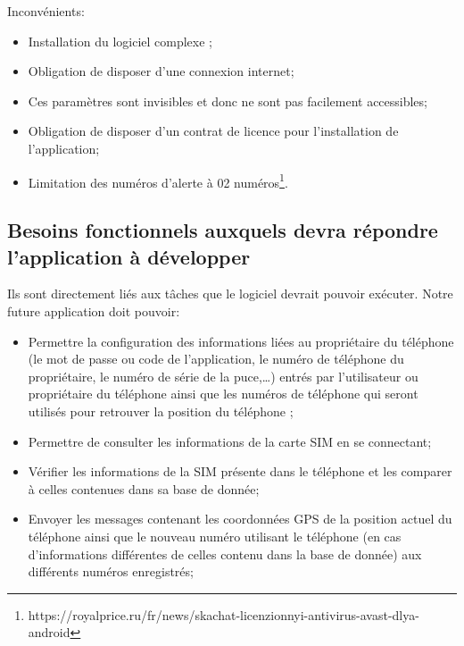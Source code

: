 \documentclass[a4paper, 12pt]{article}
\begin{document}
Inconvénients:
\begin{itemize}
\item Installation du logiciel complexe ;
\item Obligation de disposer d’une connexion internet;
\item Ces paramètres sont invisibles et donc ne sont pas facilement accessibles;
\item Obligation de disposer d’un contrat de licence pour l’installation de l’application;
\item Limitation des numéros d’alerte à 02 numéros\footnote{https://royalprice.ru/fr/news/skachat-licenzionnyi-antivirus-avast-dlya-android}.
\end{itemize}

\subsection{Besoins fonctionnels auxquels devra répondre l'application à développer}
\quad Ils sont directement liés aux tâches que le logiciel devrait pouvoir exécuter. Notre future application doit pouvoir:
\begin{itemize}
\item Permettre la configuration des informations liées au propriétaire du téléphone (le mot de passe ou code de l’application, le numéro de téléphone du propriétaire, le numéro de série de la puce,…) entrés par l’utilisateur ou propriétaire du téléphone ainsi que les numéros de téléphone qui seront utilisés pour retrouver la position du téléphone ;
\item Permettre de consulter les informations de la carte SIM en se connectant;
\item Vérifier les informations de la SIM présente dans le téléphone et les comparer à celles contenues dans sa base de donnée;
\item Envoyer les messages contenant les coordonnées GPS de la position actuel du téléphone ainsi que le nouveau numéro utilisant le téléphone (en cas d’informations différentes de celles contenu dans la base de donnée) aux différents numéros enregistrés;
\end{itemize}
\end{document}

